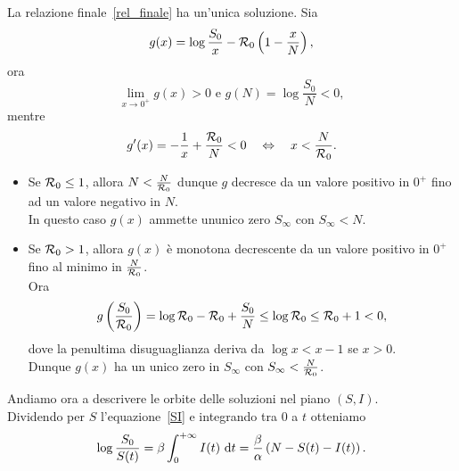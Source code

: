 \begin{prop}
La relazione finale~\eqref{rel_finale}  ha un'unica soluzione.
\proof 
Sia 
$$ g(x) =\log \frac{S_0}{x} -\mathcal R_0 \left(  1 -\frac{x}{N} \right), $$
ora 
$$\lim_{x\to 0^+} g(x)>0 \text{  e }  g(N) =\log\frac{S_0}{N} < 0, $$ 
mentre
$$g'(x)=-\frac{1}{x} + \frac{\mathcal R_0}{N} < 0\quad \Leftrightarrow \quad x < \frac{N}{\mathcal R_0}. $$
\begin{itemize}
	\item Se $\mathcal R_0\leq 1 $,   allora $N < \frac{N}{\mathcal R_0}$ dunque $g$ decresce da un valore positivo in $0^+$  fino ad un valore negativo in $N$.\\
	In questo caso  $g(x)$ ammette ununico zero   $S_\infty$ con $S_\infty< N $.
	\item Se $\mathcal R_0 >1$, allora $g(x)$ \`e monotona decrescente da un valore positivo in $0^+$ fino al minimo in $\frac{N}{\mathcal R_0}$.\\
Ora
$$ g\left(  \frac{S_0}{\mathcal R_0} \right) =\log \mathcal R_0 - \mathcal R_0 +\frac{S_0}{N}\leq \log \mathcal R_0 \leq  \mathcal R_0 + 1 <0,$$
dove la penultima disuguaglianza deriva da $\log x < x - 1$ se $x>0$.\\
Dunque $g(x)$ ha un unico zero in $S_\infty$ con $S_\infty< \frac{N}{\mathcal R_0}$.
\end{itemize}
\endproof	
\end{prop}

\vspace{0.5 cm}

Andiamo ora a descrivere le orbite delle soluzioni nel piano $(S,I)$.\\
Dividendo per $S$  l'equazione~\eqref{SI} e integrando tra $0$ a $t$ otteniamo 
$$ \log \frac{S_0}{S(t)} =\beta \int_0^{+\infty } I(t) \,\,\mathrm{d} t = \frac{\beta}{\alpha} \left(  N- S(t) - I(t) \right).$$ 
\newpage

